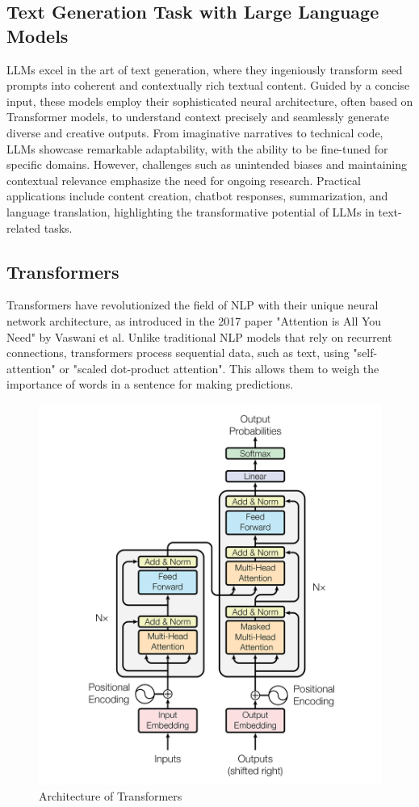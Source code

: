 \subsection{Text Generation Task with Large Language Models}

LLMs excel in the art of text generation, where they ingeniously transform seed prompts into coherent and contextually rich textual content. Guided by a concise input, these models employ their sophisticated neural architecture, often based on Transformer models, to understand context precisely and seamlessly generate diverse and creative outputs. From imaginative narratives to technical code, LLMs showcase remarkable adaptability, with the ability to be fine-tuned for specific domains. However, challenges such as unintended biases and maintaining contextual relevance emphasize the need for ongoing research. Practical applications include content creation, chatbot responses, summarization, and language translation, highlighting the transformative potential of LLMs in text-related tasks.\cite{zhao2023survey}

\subsection{Transformers} \label{Transformers}

Transformers have revolutionized the field of NLP with their unique neural network architecture, as introduced in the 2017 paper "Attention is All You Need" by Vaswani et al\cite{vaswani2023attention}. Unlike traditional NLP models that rely on recurrent connections, transformers process sequential data, such as text, using "self-attention" or "scaled dot-product attention". This allows them to weigh the importance of words in a sentence for making predictions.

\begin{figure}[H]
	\centering
	\includegraphics[width=0.5\linewidth]{images/transformers}
	\caption{Architecture of Transformers \cite{vaswani2023attention}}
	\label{fig:transofrmers}
\end{figure}


